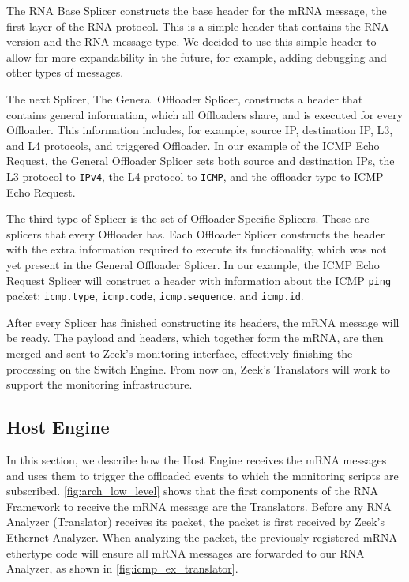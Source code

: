 The RNA Base Splicer constructs the base header for the mRNA message, the first layer of the RNA protocol. This is a simple header that contains the RNA version and the RNA message type. We decided to use this simple header to allow for more expandability in the future, for example, adding debugging and other types of messages.


The next Splicer, The General Offloader Splicer, constructs a header that contains general information, which all Offloaders share, and is executed for every Offloader. This information includes, for example, source IP, destination IP, L3, and L4 protocols, and triggered Offloader. In our example of the ICMP Echo Request, the General Offloader Splicer sets both source and destination IPs, the L3 protocol to \texttt{IPv4}, the L4 protocol to \texttt{ICMP}, and the offloader type to ICMP Echo Request.

The third type of Splicer is the set of Offloader Specific Splicers. These are splicers that every Offloader has. Each Offloader Splicer constructs the header with the extra information required to execute its functionality, which was not yet present in the General Offloader Splicer. In our example, the ICMP Echo Request Splicer will construct a header with information about the ICMP \texttt{ping} packet: \texttt{icmp.type}, \texttt{icmp.code}, \texttt{icmp.sequence}, and \texttt{icmp.id}.



After every Splicer has finished constructing its headers, the mRNA message will be ready. The payload and headers, which together form the mRNA, are then merged and sent to Zeek's monitoring interface, effectively finishing the processing on the Switch Engine. From now on, Zeek's Translators will work to support the monitoring infrastructure.

\subsection{Host Engine}

In this section, we describe how the Host Engine receives the mRNA messages and uses them to trigger the offloaded events to which the monitoring scripts are subscribed. \autoref{fig:arch_low_level} shows that the first components of the RNA Framework to receive the mRNA message are the Translators. Before any RNA Analyzer (Translator) receives its packet, the packet is first received by Zeek's Ethernet Analyzer. When analyzing the packet, the previously registered mRNA ethertype code will ensure all mRNA messages are forwarded to our RNA Analyzer, as shown in \autoref{fig:icmp_ex_translator}.


